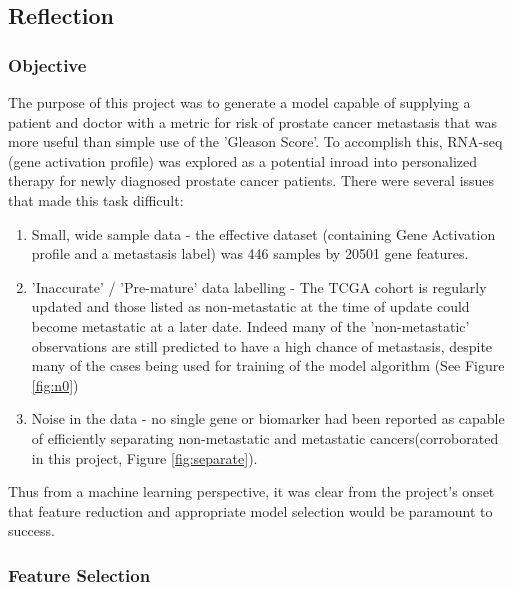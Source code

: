 \documentclass[final]{article}
\begin{document}
\subsection{Reflection}

\subsubsection{Objective}

The purpose of this project was to generate a model capable of supplying a
patient and doctor with a metric for risk of prostate cancer metastasis that was
more useful than simple use of the 'Gleason Score'.  To accomplish this, RNA-seq
(gene activation profile) was explored as a potential inroad into personalized
therapy for newly diagnosed prostate cancer patients.  There were several issues
that made this task difficult:

\begin{enumerate} \item Small, wide sample data - the effective dataset
(containing Gene Activation profile and a metastasis label) was 446 samples by
20501 gene features.
\item 'Inaccurate' / 'Pre-mature' data labelling - The TCGA
cohort is regularly updated and those listed as non-metastatic at the time of
update could become metastatic at a later date.  Indeed many of the
'non-metastatic' observations are still predicted to have a high chance of
metastasis, despite many of the cases being used for training of the model
algorithm (See Figure \ref{fig:n0})
\item Noise in the data - no single gene or
biomarker had been reported as capable of efficiently separating non-metastatic
and metastatic cancers(corroborated in this project, Figure \ref{fig:separate}).
\end{enumerate}

Thus from a machine learning perspective, it was clear from the project's onset
that feature reduction and appropriate model selection would be paramount to
success.

\subsubsection{Feature Selection}
\end{document}

